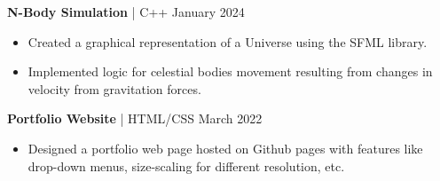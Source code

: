 \documentclass[11pt]{article}       %
\begin{document}
\textbf{N-Body Simulation} | C++ \hfill January 2024 \\
\vspace{-9pt}
\begin{itemize}
  \item Created a graphical representation of a Universe using the SFML library.
  \item Implemented logic for celestial bodies movement resulting from changes in velocity from gravitation forces.
\end{itemize}

\textbf{Portfolio Website} | HTML/CSS \hfill March 2022 \\
\vspace{-9pt}
\begin{itemize}
    \item Designed a portfolio web page hosted on Github pages with features like drop-down menus, size-scaling for different resolution, etc.

\end{itemize}

\vspace{-18.5pt}
\end{document}
